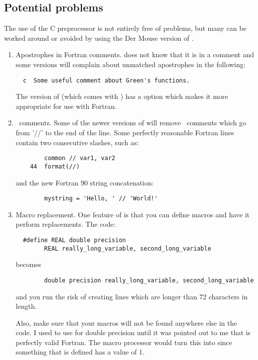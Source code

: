 \subsection{Potential problems}
The use of the C preprocessor is not entirely free of problems, but
many can be worked around or avoided by using the Der Mouse version of
.
   \begin{enumerate}
     \item Apostrophes in Fortran comments.   does not
     know that it is in a comment and some versions will complain about
     unmatched apostrophes in the following:
     \begin{verbatim}
  c  Some useful comment about Green's functions.
     \end{verbatim}
     The  version of  (which comes with )
     has a  option which makes it more
     appropriate for use with Fortran.
     \item \CC\ comments.  Some of the newer versions of
      will remove \CC\ comments which go from '//' to
     the end of the line.  Some perfectly reasonable Fortran lines
     contain two consecutive slashes, such as:
     \begin{verbatim}
        common // var1, var2
    44  format(//)
     \end{verbatim}
     and the new Fortran 90 string concatenation:
     \begin{verbatim}
        mystring = 'Hello, ' // 'World!'
     \end{verbatim}
     \item Macro replacement.  One feature of  is that you
     can define macros and have it perform replacements.  The code:
     \begin{verbatim}
  #define REAL double precision
        REAL really_long_variable, second_long_variable
     \end{verbatim}
     becomes
     \begin{verbatim}
        double precision really_long_variable, second_long_variable
     \end{verbatim}
     and you run the risk of creating lines which are longer than 72
     characters in length.

     Also, make sure that your macros will not be found anywhere else
     in the code.  I used to use  for double
     precision until it was pointed out to me that  is perfectly valid Fortran.  The macro processor would
     turn this into  since something that is defined
     has a value of 1.
  \end{enumerate}

